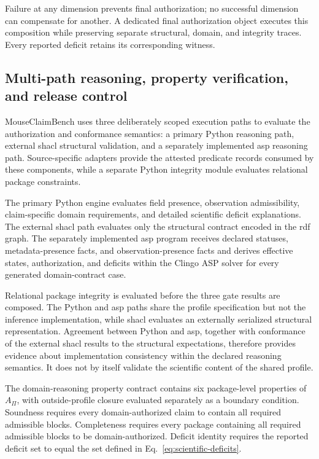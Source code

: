 \documentclass[11pt,a4paper]{article}
\begin{document}
Failure at any dimension prevents final authorization; no successful
dimension can compensate for another. A dedicated final authorization object
executes this composition while preserving separate structural, domain, and
integrity traces. Every reported deficit retains its corresponding witness.


\subsection{Multi-path reasoning, property verification, and release control}
\label{subsec:execution-release}

MouseClaimBench uses three deliberately scoped execution paths to evaluate
the authorization and conformance semantics: a primary Python reasoning path,
external \ac{shacl} structural validation, and a separately implemented
\ac{asp} reasoning path. Source-specific adapters provide the attested
predicate records consumed by these components, while a separate Python
integrity module evaluates relational package constraints.

The primary Python engine evaluates field presence, observation admissibility,
claim-specific domain requirements, and detailed scientific deficit
explanations. The external \ac{shacl} path evaluates only the structural
contract encoded in the \ac{rdf} graph. The separately implemented \ac{asp}
program receives declared statuses, metadata-presence facts, and
observation-presence facts and derives effective states, authorization, and
deficits within the Clingo ASP solver for every generated domain-contract
case.

Relational package integrity is evaluated before the three gate results are
composed. The Python and \ac{asp} paths share the profile specification but
not the inference implementation, while \ac{shacl} evaluates an externally
serialized structural representation. Agreement between Python and
\ac{asp}, together with conformance of the external \ac{shacl} results to the
structural expectations, therefore provides evidence about implementation
consistency within the declared reasoning semantics. It does not by itself
validate the scientific content of the shared profile.

The domain-reasoning property contract contains six package-level properties
of $A_{\Pi}$, with outside-profile closure evaluated separately as a boundary
condition. Soundness requires every domain-authorized claim to contain all
required admissible blocks. Completeness requires every package containing
all required admissible blocks to be domain-authorized. Deficit identity
requires the reported deficit set to equal the set defined in
Eq.~\ref{eq:scientific-deficits}.
\end{document}
